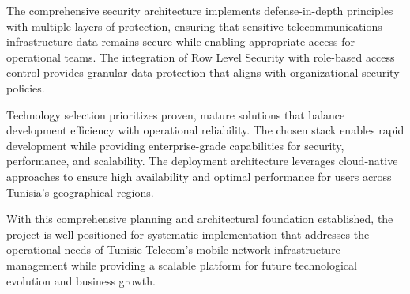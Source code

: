 The comprehensive security architecture implements defense-in-depth principles with multiple layers of protection, ensuring that sensitive telecommunications infrastructure data remains secure while enabling appropriate access for operational teams. The integration of Row Level Security with role-based access control provides granular data protection that aligns with organizational security policies.

Technology selection prioritizes proven, mature solutions that balance development efficiency with operational reliability. The chosen stack enables rapid development while providing enterprise-grade capabilities for security, performance, and scalability. The deployment architecture leverages cloud-native approaches to ensure high availability and optimal performance for users across Tunisia's geographical regions.

With this comprehensive planning and architectural foundation established, the project is well-positioned for systematic implementation that addresses the operational needs of Tunisie Telecom's mobile network infrastructure management while providing a scalable platform for future technological evolution and business growth.